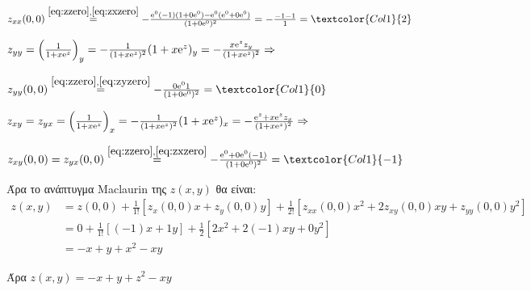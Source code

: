\documentclass[a4paper,table]{report}
\begin{document}
\begin{solution}
\begin{myitemize}
      $ z_{xx}(0,0) \overset{\eqref{eq:zzero}, \eqref{eq:zxzero}}{=} -
      \frac{\mathrm{e}^{0} (-1) (1+0 \mathrm{e}^{0}) - \mathrm{e}^{0} (\mathrm{e}^{0} + 0
      \mathrm{e}^{0})}{(1+ 0 \mathrm{e}^{0})^{2}} = - \frac{-1-1}{1} =
      \textcolor{Col1}{2}  $

    \item $ z_{yy} = \Bigl(\frac{1}{1+ x \mathrm{e}^{z}}\Bigr)_{y} = - \frac{1}{(1+x
        \mathrm{e}^{z} )^{2}} (1+x \mathrm{e}^{z} )_{y} = - \frac{x \mathrm{e}^{z}
      z_{y}}{(1+x \mathrm{e}^{z} )^{2}} \Rightarrow $

      $ z_{yy}(0,0) \overset{\eqref{eq:zzero}, \eqref{eq:zyzero}}{=} - \frac{0
      \mathrm{e}^{0} 1}{(1+0 \mathrm{e}^{0})^{2}} = \textcolor{Col1}{0} $

    \item $ z_{xy} = z_{yx} = \Bigl(\frac{1}{1+ x \mathrm{e}^{z}}\Bigr)_{x} = 
      - \frac{1}{(1+x \mathrm{e}^{z} )^{2}} (1+x \mathrm{e}^{z} )_{x} = -
      \frac{\mathrm{e}^{z} + x \mathrm{e}^{z} z_{x}}{(1+x \mathrm{e}^{z} )^{2}}
      \Rightarrow $ 

      $ z_{xy}(0,0) = z_{yx}(0,0)  \overset{\eqref{eq:zzero}, \eqref{eq:zxzero}}{=} 
      - \frac{\mathrm{e}^{0} + 0 \mathrm{e}^{0}(-1)}{(1+ 0 
      \mathrm{e}^{0})^{2}} = \textcolor{Col1}{-1} $
  \end{myitemize}

  Άρα το ανάπτυγμα Maclaurin της $ z(x,y) $ θα είναι:
  \begin{align*}
    z(x,y) &= z(0,0) + \frac{1}{1!} [ z_x(0,0)x+z_{y}(0,0)y ] + 
    \frac{1}{2!} [ z_{xx}(0,0)x^{2}+2z_{xy}(0,0)xy+z_{yy}(0,0)y^{2} ] \\
           &= 0 + \frac{1}{1!} [(-1)x+1y] + \frac{1}{2} [2x^{2}+2(-1)xy+0y^{2}] \\ 
           &= -x+y + x^{2}-xy
  \end{align*}

  Άρα $ z(x,y) = -x+y+z^{2}-xy $

\end{solution}
\end{document}
